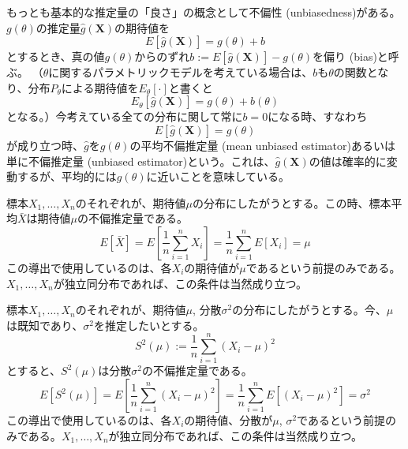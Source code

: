 \documentclass[uplatex,dvipdfmx]{jlreq}
\newcommand\term[1]{\textsf{#1}}
\begin{document}
もっとも基本的な推定量の「良さ」の概念として\term{不偏性 (unbiasedness)}がある。$g(\theta)$の推定量$\hat{g}(\boldsymbol{X})$の期待値を
\begin{equation}
    E[\hat{g}(\boldsymbol{X})] = g(\theta) + b
\end{equation}
とするとき、真の値$g(\theta)$からのずれ$b := E[\hat{g}(\boldsymbol{X})] - g(\theta)$を\term{偏り (bias)}と呼ぶ。
（$\theta$に関するパラメトリックモデルを考えている場合は、$b$も$\theta$の関数となり、分布$P_\theta$による期待値を$E_\theta[\cdot]$と書くと
\begin{equation}
    E_\theta[\hat{g}(\boldsymbol{X})] = g(\theta) + b(\theta)
\end{equation}
となる。）今考えている全ての分布に関して常に$b=0$になる時、すなわち
\begin{equation}
    E[\hat{g}(\boldsymbol{X})] = g(\theta)
\end{equation}
が成り立つ時、$\hat{g}$を$g(\theta)$の\term{平均不偏推定量 (mean unbiased estimator)}あるいは単に\term{不偏推定量 (unbiased estimator)}という。これは、$\hat{g}(\boldsymbol{X})$の値は確率的に変動するが、平均的には$g(\theta)$に近いことを意味している。

\begin{example}[期待値の不偏推定量]\label{u_est_exp}
    標本$X_1, \dotsc, X_n$のそれぞれが、期待値$\mu$の分布にしたがうとする。この時、標本平均$\bar{X}$は期待値$\mu$の不偏推定量である。
    \begin{equation}
        E[\bar{X}] = E\left[\frac{1}{n}\sum_{i=1}^n X_i\right]
        = \frac{1}{n}\sum_{i=1}^n E[X_i] = \mu
    \end{equation}
    この導出で使用しているのは、各$X_i$の期待値が$\mu$であるという前提のみである。$X_1, \dotsc, X_n$が独立同分布であれば、この条件は当然成り立つ。
\end{example}

\begin{example}[期待値が既知の場合の分散の不偏推定量]
    標本$X_1, \dotsc, X_n$のそれぞれが、期待値$\mu$, 分散$\sigma^2$の分布にしたがうとする。今、$\mu$は既知であり、$\sigma^2$を推定したいとする。
    \begin{equation}
        S^2(\mu) := \frac{1}{n}\sum_{i=1}^n(X_i-\mu)^2
    \end{equation}
    とすると、$S^2(\mu)$は分散$\sigma^2$の不偏推定量である。
    \begin{equation}
        E[S^2(\mu)]
        = E\left[\frac{1}{n}\sum_{i=1}^n(X_i-\mu)^2\right]
        = \frac{1}{n}\sum_{i=1}^nE[(X_i-\mu)^2]
        = \sigma^2
    \end{equation}
    この導出で使用しているのは、各$X_i$の期待値、分散が$\mu$, $\sigma^2$であるという前提のみである。$X_1, \dotsc, X_n$が独立同分布であれば、この条件は当然成り立つ。
\end{example}
\end{document}
